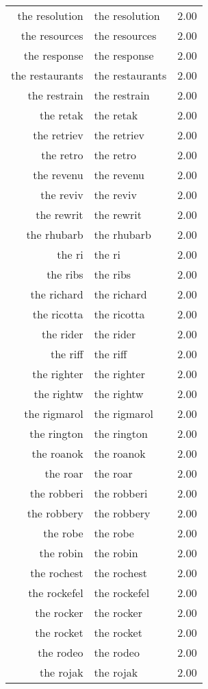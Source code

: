 \begin{table}[ht]
\begin{tabular}{rlr}
  the resolution & the resolution & 2.00 \\ 
  the resources & the resources & 2.00 \\ 
  the response & the response & 2.00 \\ 
  the restaurants & the restaurants & 2.00 \\ 
  the restrain & the restrain & 2.00 \\ 
  the retak & the retak & 2.00 \\ 
  the retriev & the retriev & 2.00 \\ 
  the retro & the retro & 2.00 \\ 
  the revenu & the revenu & 2.00 \\ 
  the reviv & the reviv & 2.00 \\ 
  the rewrit & the rewrit & 2.00 \\ 
  the rhubarb & the rhubarb & 2.00 \\ 
  the ri & the ri & 2.00 \\ 
  the ribs & the ribs & 2.00 \\ 
  the richard & the richard & 2.00 \\ 
  the ricotta & the ricotta & 2.00 \\ 
  the rider & the rider & 2.00 \\ 
  the riff & the riff & 2.00 \\ 
  the righter & the righter & 2.00 \\ 
  the rightw & the rightw & 2.00 \\ 
  the rigmarol & the rigmarol & 2.00 \\ 
  the rington & the rington & 2.00 \\ 
  the roanok & the roanok & 2.00 \\ 
  the roar & the roar & 2.00 \\ 
  the robberi & the robberi & 2.00 \\ 
  the robbery & the robbery & 2.00 \\ 
  the robe & the robe & 2.00 \\ 
  the robin & the robin & 2.00 \\ 
  the rochest & the rochest & 2.00 \\ 
  the rockefel & the rockefel & 2.00 \\ 
  the rocker & the rocker & 2.00 \\ 
  the rocket & the rocket & 2.00 \\ 
  the rodeo & the rodeo & 2.00 \\ 
  the rojak & the rojak & 2.00 \\ 

\end{tabular}
\end{table}
